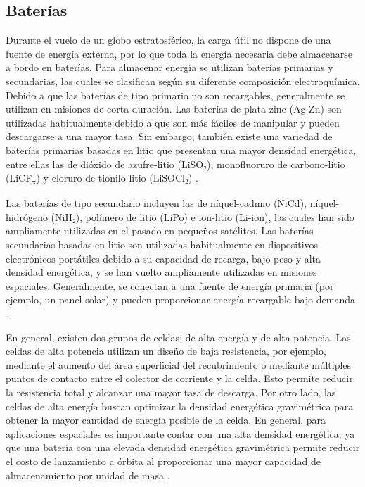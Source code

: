\documentclass[12pt,a4paper]{article}
\begin{document}
\subsection{Baterías}\label{baterias}

Durante el vuelo de un globo estratosférico, la carga útil no dispone de una fuente de energía externa, por lo que toda la energía necesaria debe almacenarse a bordo en baterías. Para almacenar energía se utilizan baterías primarias y secundarias, las cuales se clasifican según su diferente composición electroquímica. Debido a que las baterías de tipo primario no son recargables, generalmente se utilizan en misiones de corta duración. Las baterías de plata-zinc (Ag-Zn) son utilizadas habitualmente debido a que son más fáciles de manipular y pueden descargarse a una mayor tasa. Sin embargo, también existe una variedad de baterías primarias basadas en litio que presentan una mayor densidad energética, entre ellas las de dióxido de azufre-litio (LiSO₂), monofluoruro de carbono-litio (LiCF\textsubscript{x}) y cloruro de tionilo-litio (LiSOCl₂) \cite{ref39}.

Las baterías de tipo secundario incluyen las de níquel-cadmio (NiCd), níquel-hidrógeno (NiH₂), polímero de litio (LiPo) e ion-litio (Li-ion), las cuales han sido ampliamente utilizadas en el pasado en pequeños satélites. Las baterías secundarias basadas en litio son utilizadas habitualmente en dispositivos electrónicos portátiles debido a su capacidad de recarga, bajo peso y alta densidad energética, y se han vuelto ampliamente utilizadas en misiones espaciales. Generalmente, se conectan a una fuente de energía primaria (por ejemplo, un panel solar) y pueden proporcionar energía recargable bajo demanda \cite{ref39}.

En general, existen dos grupos de celdas: de alta energía y de alta potencia. Las celdas de alta potencia utilizan un diseño de baja resistencia, por ejemplo, mediante el aumento del área superficial del recubrimiento o mediante múltiples puntos de contacto entre el colector de corriente y la celda. Esto permite reducir la resistencia total y alcanzar una mayor tasa de descarga. Por otro lado, las celdas de alta energía buscan optimizar la densidad energética gravimétrica para obtener la mayor cantidad de energía posible de la celda. En general, para aplicaciones espaciales es importante contar con una alta densidad energética, ya que una batería con una elevada densidad energética gravimétrica permite reducir el costo de lanzamiento a órbita al proporcionar una mayor capacidad de almacenamiento por unidad de masa \cite{ref39}.
\end{document}
